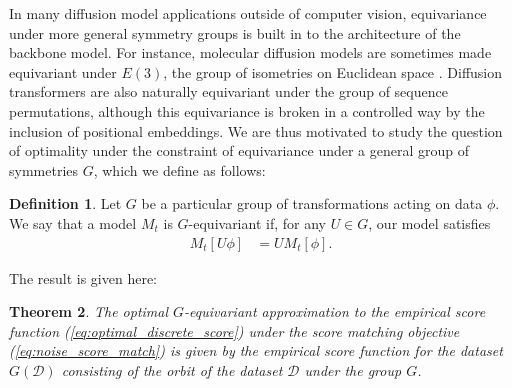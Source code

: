 \documentclass{article}
\theoremstyle{plain}
\newtheorem{theorem}{Theorem}[section]
\theoremstyle{definition}
\newtheorem{definition}[theorem]{Definition}
\theoremstyle{remark}
\begin{document}
In many diffusion model applications outside of computer vision, equivariance under more general symmetry groups is built in to the architecture of the backbone model. For instance, molecular diffusion models are sometimes made equivariant under $E(3)$, the group of isometries on Euclidean space \cite{hoogeboom2022equivariant}. Diffusion transformers \cite{peebles2023scalable} are also naturally equivariant under the group of sequence permutations, although this equivariance is broken in a controlled way by the inclusion of positional embeddings. We are thus motivated to study the question of optimality under the constraint of equivariance under a general group of symmetries $G$, which we define as follows:
\begin{definition}
Let $G$ be a particular group of transformations acting on data $\phi$. We say that a model $M_t$ is $G$-equivariant if, for any $U \in G$, our model satisfies
\begin{align}
    M_t[U \phi] &= U M_t[\phi].
\end{align}\end{definition}
The result is given here:
\begin{theorem}
The optimal $G$-equivariant approximation to the empirical score function (\ref{eq:optimal_discrete_score}) under the score matching objective (\ref{eq:noise_score_match}) is given by the empirical score function for the dataset $G(\mathcal{D})$ consisting of the orbit of the dataset $\mathcal{D}$ under the group $G$.
\end{theorem}
\end{document}
